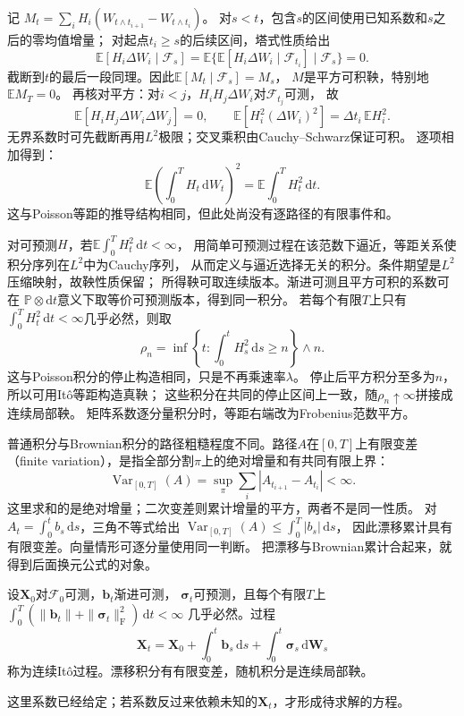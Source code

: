 记
$M_t=\sum_iH_i(W_{t\wedge t_{i+1}}-W_{t\wedge t_i})$。
对$s<t$，包含$s$的区间使用已知系数和$s$之后的零均值增量；
对起点$t_i\geq s$的后续区间，塔式性质给出
\[
  \mathbb E[H_i\Delta W_i\mid\mathcal F_s]
   =\mathbb E\{\mathbb E[H_i\Delta W_i\mid\mathcal F_{t_i}]
                  \mid\mathcal F_s\}=0.
\]
截断到$t$的最后一段同理。因此$\mathbb E[M_t\mid\mathcal F_s]=M_s$，
$M$是平方可积鞅，特别地$\mathbb E M_T=0$。
再核对平方：对$i<j$，$H_iH_j\Delta W_i$对$\mathcal F_{t_j}$可测，
故
\[
  \mathbb E[H_iH_j\Delta W_i\Delta W_j]=0,\qquad
  \mathbb E[H_i^2(\Delta W_i)^2]=\Delta t_i\,\mathbb E H_i^2.
\]
无界系数时可先截断再用$L^2$极限；交叉乘积由Cauchy--Schwarz保证可积。
逐项相加得到：
\begin{equation}
  \mathbb E\left(\int_0^T H_t\,\mathrm dW_t\right)^2
       =\mathbb E\int_0^T H_t^2\,\mathrm dt.
  \label{eq:dynamical-ito-isometry}
\end{equation}
这与Poisson等距的推导结构相同，但此处尚没有逐路径的有限事件和。

对可预测$H$，若$\mathbb E\int_0^T H_t^2\,\mathrm dt<\infty$，
用简单可预测过程在该范数下逼近，等距关系使积分序列在$L^2$中为Cauchy序列，
从而定义与逼近选择无关的积分。条件期望是$L^2$压缩映射，故鞅性质保留；
所得鞅可取连续版本。渐进可测且平方可积的系数可在
$\mathbb P\otimes\mathrm dt$意义下取等价可预测版本，得到同一积分。
若每个有限$T$上只有$\int_0^T H_t^2\,\mathrm dt<\infty$几乎必然，则取
\[
 \rho_n=\inf\left\{t:\int_0^tH_s^2\,\mathrm ds\geq n\right\}\wedge n.
\]
这与Poisson积分的停止构造相同，只是不再乘速率$\lambda$。
停止后平方积分至多为$n$，所以可用Itô等距构造真鞅；
这些积分在共同的停止区间上一致，随$\rho_n\uparrow\infty$拼接成连续局部鞅。
矩阵系数逐分量积分时，等距右端改为Frobenius范数平方。

普通积分与Brownian积分的路径粗糙程度不同。路径$A$在$[0,T]$上有限变差
（finite variation），是指全部分割$\pi$上的绝对增量和有共同有限上界：
\[
 \operatorname{Var}_{[0,T]}(A)
 =\sup_\pi\sum_i|A_{t_{i+1}}-A_{t_i}|<\infty.
\]
这里求和的是绝对增量；二次变差则累计增量的平方，两者不是同一性质。
对$A_t=\int_0^t b_s\,\mathrm ds$，三角不等式给出
$\operatorname{Var}_{[0,T]}(A)\leq\int_0^T|b_s|\,\mathrm ds$，
因此漂移累计具有有限变差。向量情形可逐分量使用同一判断。
把漂移与Brownian累计合起来，就得到后面换元公式的对象。
\begin{definition}[连续Itô过程]
  \label{def:action-state-ito-process}
  设$\bm X_0$对$\mathcal F_0$可测，$\bm b_t$渐进可测，
  $\bm\sigma_t$可预测，且每个有限$T$上
  $\int_0^T(\|\bm b_t\|+\|\bm\sigma_t\|_{\mathrm F}^2)\,\mathrm dt<\infty$
  几乎必然。过程
  \[
    \bm X_t=\bm X_0+\int_0^t\bm b_s\,\mathrm ds
                         +\int_0^t\bm\sigma_s\,\mathrm d\bm W_s
  \]
  称为连续Itô过程。漂移积分有有限变差，随机积分是连续局部鞅。
\end{definition}
这里系数已经给定；若系数反过来依赖未知的$\bm X_t$，才形成待求解的方程。

